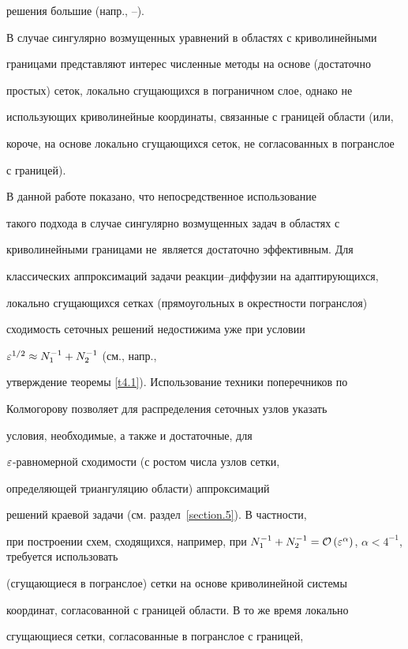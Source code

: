решения большие (напр., \cite{5}--\cite{7}).


В случае сингулярно возмущенных уравнений в областях с криволинейными


границами представляют интерес численные методы на основе (достаточно


простых) сеток, локально сгущающихся в пограничном слое, однако не


использующих криволинейные координаты, связанные с границей области (или,


короче, на основе локально сгущающихся сеток, не согласованных в погранслое


с границей).





В данной работе показано, что непосредственное использование


такого подхода в случае сингулярно возмущенных задач в областях с


криволинейными границами не~является достаточно эффективным. Для


классических аппроксимаций задачи реакции--диффузии на адаптирующихся,


локально сгущающихся сетках (прямоугольных в окрестности погранслоя)


сходимость сеточных решений недостижима уже при условии


$\varepsilon^{1/2}\approx N_1^{-1}+N_2^{-1}$ (см., напр.,


утверждение теоремы \ref{t4.1}). Использование техники поперечников по


Колмогорову позволяет для распределения сеточных узлов указать


условия, необходимые, а также и достаточные, для


$\varepsilon$-равномерной сходимости (с ростом числа узлов сетки,


определяющей триангуляцию области) аппроксимаций


решений краевой задачи (см. раздел~\ref{section.5}). В частности,


при построении схем, сходящихся, например, при $N_1^{-1}+N_2^{-1}=


\Oh{\eps^{\alpha}}$, $\alpha<4^{-1}$, требуется использовать


(сгущающиеся в погранслое) сетки на основе криволинейной системы


координат, согласованной с границей области. В то же время локально


сгущающиеся сетки, согласованные в погранслое с границей,


